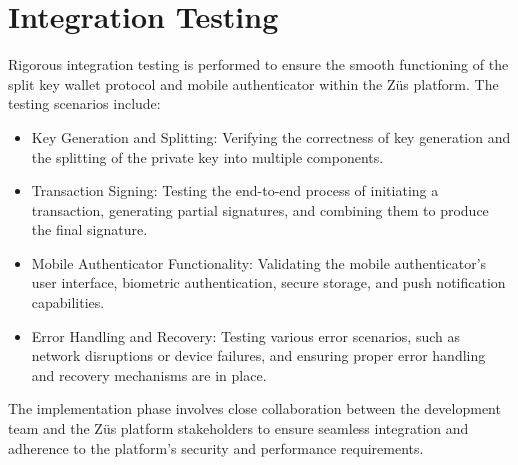 \section{Integration Testing}
Rigorous integration testing is performed to ensure the smooth functioning of the split key wallet protocol and mobile authenticator within the Züs platform. The testing scenarios include:
\begin{itemize}
    \item Key Generation and Splitting: Verifying the correctness of key generation and the splitting of the private key into multiple components.
    \item Transaction Signing: Testing the end-to-end process of initiating a transaction, generating partial signatures, and combining them to produce the final signature.
    \item Mobile Authenticator Functionality: Validating the mobile authenticator's user interface, biometric authentication, secure storage, and push notification capabilities.
    \item Error Handling and Recovery: Testing various error scenarios, such as network disruptions or device failures, and ensuring proper error handling and recovery mechanisms are in place.
\end{itemize}

The implementation phase involves close collaboration between the development team and the Züs platform stakeholders to ensure seamless integration and adherence to the platform's security and performance requirements.
